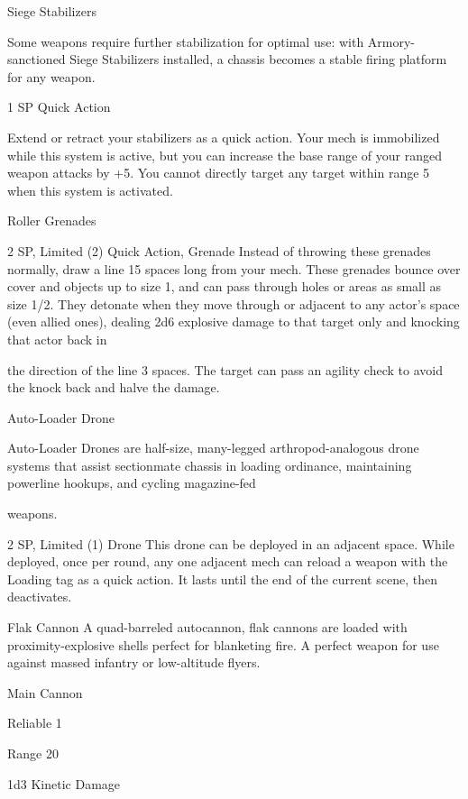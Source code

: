 Siege Stabilizers  

Some weapons require further stabilization for optimal use: with Armory-sanctioned Siege Stabilizers  
installed, a chassis becomes a stable firing platform for any weapon.   

1 SP  
Quick Action
 
Extend or retract your stabilizers as a quick action. Your mech is immobilized while this system is  
active, but you can increase the base range of your ranged weapon attacks by +5. You cannot  
directly target any target within range 5 when this system is activated.
 

Roller Grenades  

2 SP, Limited (2)  
Quick Action, Grenade  
Instead of throwing these grenades normally, draw a line 15 spaces long from your mech. These  
grenades bounce over cover and objects up to size 1, and can pass through holes or areas as  
small as size 1/2. They detonate when they move through or adjacent to any actor’s space (even  
allied ones), dealing 2d6 explosive damage to that target only and knocking that actor back in  

                                                                                                                


the direction of the line 3 spaces. The target can pass an agility check to avoid the knock back  
and halve the damage.
 

Auto-Loader Drone  

Auto-Loader Drones are half-size, many-legged arthropod-analogous drone systems that assist  
sectionmate chassis in loading ordinance, maintaining powerline hookups, and cycling magazine-fed  

weapons.  

2 SP, Limited (1)  
Drone  
This drone can be deployed in an adjacent space. While deployed, once per round, any one  
adjacent mech can reload a weapon with the Loading tag as a quick action. It lasts until the end  
of the current scene, then deactivates.
 

Flak Cannon  
A quad-barreled autocannon, flak cannons are loaded with proximity-explosive shells perfect for  
blanketing fire. A perfect weapon for use against massed infantry or low-altitude flyers.   

Main Cannon
 
Reliable 1
 
Range 20
 
1d3 Kinetic Damage
 
